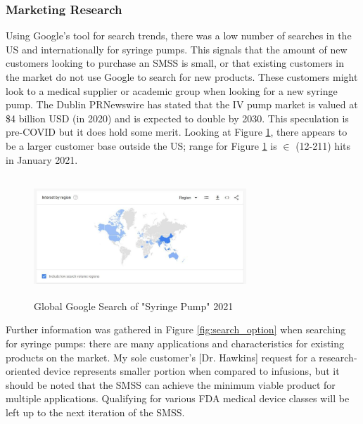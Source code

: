 \documentclass[journal]{IEEEtran}
\begin{document}
        \subsubsection{Marketing Research}
            Using Google's tool for search trends, there was a low number of searches in the US and internationally for syringe pumps. This signals that the amount of new customers looking to purchase an SMSS is small, or that existing customers in the market do not use Google to search for new products. These customers might look to a medical supplier or academic group when looking for a new syringe pump. The Dublin PRNewswire \cite{cision} has stated that the IV pump market is valued at \$4 billion USD (in 2020) and is expected to double by 2030. This speculation is pre-COVID but it does hold some merit. Looking at Figure \ref{fig:intern_interest}, there appears to be a larger customer base outside the US; range for Figure \ref{fig:intern_interest} is $\in$ (12-211) hits in January 2021.
            
            \begin{figure}[H]
                \centering
                \includegraphics[width=8cm, height=4.5cm]{Images/INT_interest.png}
                \caption{Global Google Search of "Syringe Pump" 2021 \cite{goog_trend}}
                \label{fig:intern_interest}
            \end{figure}
        
            Further information was gathered in Figure \ref{fig:search_option} when searching for syringe pumps: there are many applications and characteristics for existing products on the market. My sole customer's [Dr. Hawkins] request for a research-oriented device represents smaller portion when compared to infusions, but it should be noted that the SMSS can achieve the minimum viable product for multiple applications. Qualifying for various FDA medical device classes will be left up to the next iteration of the SMSS.
            
\end{document}

